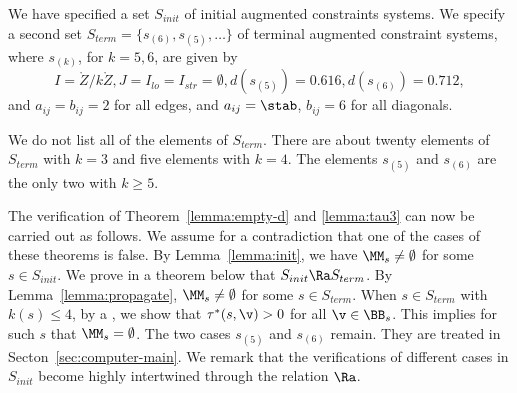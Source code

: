 We have specified a set $S_{init}$ of initial augmented constraints systems.
We specify a second set $S_{term}=\{s_{(6)},s_{(5)},\ldots\}$ 
of terminal augmented constraint systems, where
 $s_{(k)}$, for $k=5,6$,  are given by
\[
I=\ring{Z}/k\ring{Z}, J=I_{lo}=I_{str}=\emptyset, d(s_{(5)})=0.616, d(s_{(6)})=0.712,
\]
and $a_{ij}=b_{ij}=2$ for all edges, 
and $a_{ij}=\stab$, $b_{ij}=6$ for all diagonals.

We do not list all of the elements of $S_{term}$.  There are about twenty
elements of $S_{term}$ with $k=3$ and five elements with $k=4$.  The elements
$s_{(5)}$ and $s_{(6)}$ are the only two with $k\ge 5$.

\begin{remark}
The verification of 
Theorem~\ref{lemma:empty-d} and \ref{lemma:tau3} can now be
carried out as follows.  We assume for a contradiction that
one of the cases of these theorems is false.  By Lemma~\ref{lemma:init}, we have
$\MM_s\ne\emptyset$ for some $s\in S_{init}$.  We prove in a theorem
below that $S_{init}\Ra S_{term}$.  By Lemma~\ref{lemma:propagate},
$\MM_s\ne\emptyset$ for some $s\in S_{term}$.  When $s\in S_{term}$
with $k(s)\le 4$, by a , we show
that $\tau^*(s,\v) >0$ for all $\v\in \BB_s$.  This implies for such $s$
that $\MM_s=\emptyset$.  The two cases $s_{(5)}$ and $s_{(6)}$ remain.
They are treated in Secton~\ref{sec:computer-main}.
We remark that the verifications of  different cases in $S_{init}$ become
highly intertwined through the relation $\Ra$.
\end{remark}